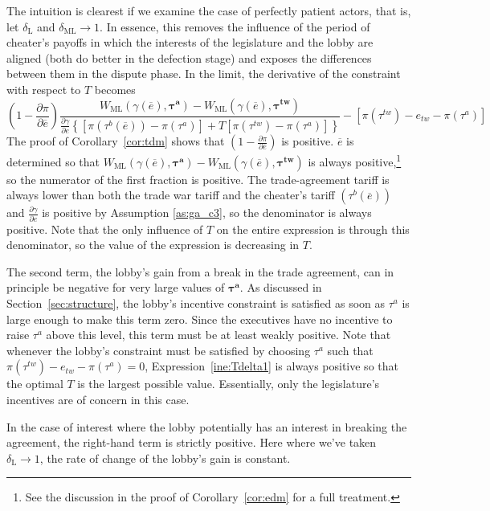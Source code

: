 \documentclass[authoryear, review]{elsarticle}
\newcommand{\ov}{\overline}
\newcommand{\bta}{\bm{\tau^a}}
\newcommand{\ga}{\gamma}
\newcommand{\btw}{\bm{\tau^{tw}}}
\newcommand{\de}{\delta}
\begin{document}
The intuition is clearest if we examine the case of perfectly patient actors, that is, let $\de_\text{L}$ and $\de_\text{ML} \rightarrow 1$. In essence, this removes the influence of the period of cheater's payoffs in which the interests of the legislature and the lobby are aligned (both do better in the defection stage) and exposes the differences between them in the dispute phase. In the limit, the derivative of the constraint with respect to $T$ becomes
\begin{equation}
  \left(1 - \frac{\partial \pi}{\partial \ov{e}} \right) \frac{ W_\text{ML}(\ga(\ov{e}),\bta) - W_\text{ML}(\ga(\ov{e}),\btw) }{\frac{\partial \ga}{\partial e} \left\{
  \left[ \pi(\tau^b(\ov{e})) - \pi(\tau^a) \right] + T \left[ \pi(\tau^{tw}) - \pi(\tau^a) \right]\right\}} - \left[ \pi(\tau^{tw}) - e_{tw} -\pi(\tau^a) \right]
 	\label{ine:Tdelta1}
\end{equation}
The proof of Corollary~\ref{cor:tdm} shows that $\left(1 - \frac{\partial \pi}{\partial \ov{e}} \right)$ is positive. $\ov{e}$ is determined so that $W_\text{ML}(\ga(\ov{e}),\bta) - W_\text{ML}(\ga(\ov{e}),\btw)$ is always positive,\footnote{See the discussion in the proof of Corollary~\ref{cor:edm} for a full treatment.} so the numerator of the first fraction is positive. The trade-agreement tariff is always lower than both the trade war tariff and the cheater's tariff $\left(\tau^b\left(\ov{e}\right)\right)$ and $\frac{\partial \ga}{\partial e}$ is positive by Assumption \ref{as:ga_c3}, so the denominator is always positive. Note that the only influence of $T$ on the entire expression is through this denominator, so the value of the expression is decreasing in $T$.

The second term, the lobby's gain from a break in the trade agreement, can in principle be negative for very large values of $\bta$. As discussed in Section~\ref{sec:structure}, the lobby's incentive constraint is satisfied as soon as $\tau^a$ is large enough to make this term zero. Since the executives have no incentive to raise $\tau^a$ above this level, this term must be at least weakly positive. Note that whenever the lobby's constraint must be satisfied by choosing $\tau^a$ such that $\pi(\tau^{tw}) - e_{tw} -\pi(\tau^a) =0$, Expression~\ref{ine:Tdelta1} is always positive so that the optimal $T$ is the largest possible value. Essentially, only the legislature's incentives are of concern in this case.

In the case of interest where the lobby potentially has an interest in breaking the agreement, the right-hand term is strictly positive. Here where we've taken $\de_\text{L} \rightarrow 1$, the rate of change of the lobby's gain is constant.
\end{document}
